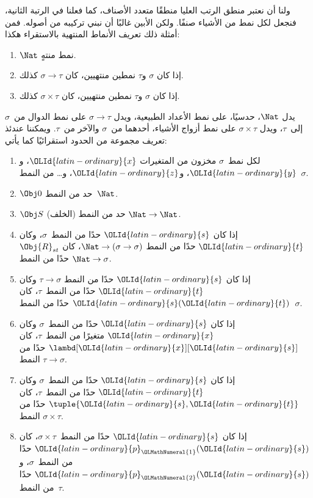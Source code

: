 \documentclass[../../../include/open-logic-section]{subfiles}
\begin{document}
ولنا أن نعتبر منطق الرتب العليا منطقًا متعدد الأصناف، كما
فعلنا في الرتبة الثانية، فنجعل لكل نمط من الأشياء صنفًا.
ولكن الأبين غالبًا أن نبني تركيبه من أصوله. فمن أمثلة ذلك
تعريف الأنماط المنتهية بالاستقراء هكذا:
\begin{enumerate}
\item $\Nat$ نمط منتهٍ.
\item إذا كان $\sigma$ و$\tau$ نمطين منتهيين، كان $\sigma
  \to \tau$ كذلك.
\item إذا كان $\sigma$ و$\tau$ نمطين منتهيين، كان $\sigma \times
  \tau$ كذلك.
\end{enumerate}
يدل $\Nat$، حدسيًا، على نمط الأعداد الطبيعية، ويدل $\sigma \to
\tau$ على نمط الدوال من~$\sigma$ إلى~$\tau$، ويدل $\sigma \times
\tau$ على نمط أزواج الأشياء، أحدهما من~$\sigma$ والآخر من~$\tau$.
ويمكننا عندئذ تعريف مجموعة من الحدود استقرائيًا كما يأتي:
\begin{enumerate}
\item لكل نمط~$\sigma$ مخزون من المتغيرات ${\OLId{latin-ordinary}{x}}$، و${\OLId{latin-ordinary}{y}}$، و${\OLId{latin-ordinary}{z}}$، و\dots
  من النمط~$\sigma$.
\item $\Obj 0$ حد من النمط~$\Nat$.
\item $\Obj S$ (الخلف) حد من النمط $\Nat \to \Nat$.
\item إذا كان ${\OLId{latin-ordinary}{s}}$ حدًا من النمط~$\sigma$، وكان ${\OLId{latin-ordinary}{t}}$ حدًا من النمط
  $\Nat \to (\sigma \to \sigma)$، كان $\Obj{R}_{st}$ حدًا من النمط
  $\Nat \to \sigma$.
\item إذا كان ${\OLId{latin-ordinary}{s}}$ حدًا من النمط $\tau \to \sigma$ وكان ${\OLId{latin-ordinary}{t}}$ حدًا من
  النمط~$\tau$، كان ${\OLId{latin-ordinary}{s}}({\OLId{latin-ordinary}{t}})$ حدًا من النمط~$\sigma$.
\item إذا كان ${\OLId{latin-ordinary}{s}}$ حدًا من النمط~$\sigma$ وكان ${\OLId{latin-ordinary}{x}}$ متغيرًا من
  النمط~$\tau$، كان $\lambd[{\OLId{latin-ordinary}{x}}][{\OLId{latin-ordinary}{s}}]$ حدًا من النمط $\tau \to \sigma$.
\item إذا كان ${\OLId{latin-ordinary}{s}}$ حدًا من النمط~$\sigma$ وكان ${\OLId{latin-ordinary}{t}}$ حدًا من
  النمط~$\tau$، كان $\tuple{{\OLId{latin-ordinary}{s}}, {\OLId{latin-ordinary}{t}}}$ حدًا من النمط $\sigma \times
  \tau$.
\item إذا كان ${\OLId{latin-ordinary}{s}}$ حدًا من النمط~$\sigma \times \tau$، كان ${\OLId{latin-ordinary}{p}}_{\OLMathNumeral{1}}({\OLId{latin-ordinary}{s}})$
  حدًا من النمط~$\sigma$، و${\OLId{latin-ordinary}{p}}_{\OLMathNumeral{2}}({\OLId{latin-ordinary}{s}})$ حدًا من النمط~$\tau$.
\end{enumerate}
\end{document}

